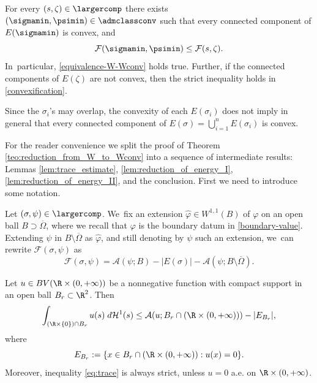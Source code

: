 \begin{theorem}
\label{teo:reduction_from_W_to_Wconv}
For every $(s,\zeta)\in\largercomp$ there exists $(\sigmamin,\psimin)\in\admclassconv$ such that every connected component of $E(\sigmamin)$ is convex, and
\begin{equation}\label{convexification}
{\mathcal{F}}(\sigmamin,\psimin)\le{\mathcal{F}}(s,\zeta).
\end{equation}
In~particular, \eqref{equivalence-W-Wconv} holds true.
Further, if the connected components of $E(\zeta)$ are not convex, then the
strict inequality holds in \eqref{convexification}.
\end{theorem}

\begin{remark}
Since the $\sigma_i$'s may overlap, the convexity of each
$E(\sigma_i)$ does not imply in general that every connected component of $E(\sigma)=\bigcup_{i=1}^nE(\sigma_i)$ is convex.
\end{remark}
For the reader convenience
we split the proof of Theorem \ref{teo:reduction_from_W_to_Wconv}
into a sequence of intermediate results: Lemmas \ref{lem:trace_estimate}, \ref{lem:reduction_of_energy_I}, \ref{lem:reduction_of_energy_II},
and the conclusion.
First we need to introduce some notation.

Let $(\sigma,\psi)\in \largercomp$. We~fix an extension $\widehat \varphi\in W^{1,1}(B)$
of $\varphi$ on an open ball $B\supset\overline\Omega$, where we recall that $\varphi$ is the boundary datum in \eqref{boundary-value}.
Extending $\psi$ in $B \setminus \overline\Omega$ as $\widehat \varphi$,
and still denoting by $\psi$ such an extension, we~can
rewrite $\mathcal F(\sigma,\psi)$ as
\begin{equation}\label{eq:equivalent_forumulation_of_F}
{\mathcal F}(\sigma,\psi)=\mathcal A(\psi;B)-|E(\sigma)|-\mathcal A(\psi;B\setminus \overline\Omega).
\end{equation}

\begin{lemma}\label{lem:trace_estimate}
Let $u\in BV(\R\times (0,+\infty))$ be a nonnegative function with compact support in an open ball $B_r\subset\R^2$. Then
\begin{equation}\label{eq:trace}
\int_{(\R\times\{0\})\cap B_r}u(s)\;d\mathcal H^1(s)\leq \mathcal A(u;B_r\cap (\R\times(0,+\infty)))-|E_{B_r}|,
\end{equation}
where
\[
E_{B_r}:=\{x\in B_{r}\cap (\R\times (0,+\infty)):u(x)=0\}.
\]
Moreover, inequality \eqref{eq:trace} is always strict, unless $u=0$ a.e. on $ \R \times (0,+\infty)$.
\end{lemma}

